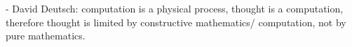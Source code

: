 









- David Deutsch: computation is a physical process, thought is a computation, therefore thought is limited by constructive mathematics/ computation, not by pure mathematics.


